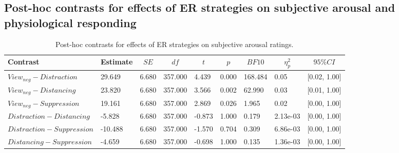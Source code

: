 \documentclass[
  man,floatsintext]{apa6}
\begin{document}
\newpage

\hypertarget{SupplementEffectER}{%
\subsection{Post-hoc contrasts for effects of ER strategies on subjective arousal and physiological responding}\label{SupplementEffectER}}

\begin{table}[H]

\begin{center}
\begin{threeparttable}

\caption{\label{tab:SupplEffectArousalReg}Post-hoc contrasts for effects of ER strategies on subjective arousal ratings.}

\footnotesize{

\begin{tabular}{lllllllll}
\toprule
Contrast & \multicolumn{1}{c}{Estimate} & \multicolumn{1}{c}{$SE$} & \multicolumn{1}{c}{$df$} & \multicolumn{1}{c}{$t$} & \multicolumn{1}{c}{$p$} & \multicolumn{1}{c}{$BF10$} & \multicolumn{1}{c}{$\eta_{p}^{2}$} & \multicolumn{1}{c}{$95\% CI$}\\
\midrule
$View_{neg} - Distraction$ & 29.649 & 6.680 & 357.000 & 4.439 & 0.000 & 168.484 & 0.05 & {}[0.02, 1.00]\\
$View_{neg} - Distancing$ & 23.820 & 6.680 & 357.000 & 3.566 & 0.002 & 62.990 & 0.03 & {}[0.01, 1.00]\\
$View_{neg} - Suppression$ & 19.161 & 6.680 & 357.000 & 2.869 & 0.026 & 1.965 & 0.02 & {}[0.00, 1.00]\\
$Distraction - Distancing$ & -5.828 & 6.680 & 357.000 & -0.873 & 1.000 & 0.179 & 2.13e-03 & {}[0.00, 1.00]\\
$Distraction - Suppression$ & -10.488 & 6.680 & 357.000 & -1.570 & 0.704 & 0.309 & 6.86e-03 & {}[0.00, 1.00]\\
$Distancing - Suppression$ & -4.659 & 6.680 & 357.000 & -0.698 & 1.000 & 0.135 & 1.36e-03 & {}[0.00, 1.00]\\
\bottomrule
\end{tabular}

}

\end{threeparttable}
\end{center}

\end{table}
\end{document}
